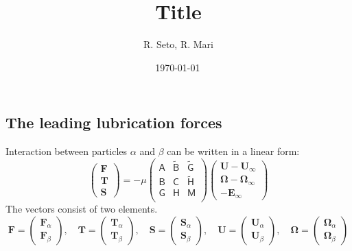 \documentclass[12pt]{article}
\title{Title}
\date{\shortdate\today \, \ampmtime }
\author{R. Seto, R. Mari}
\newcommand{\tens}[1]{\bm{\mathsf{#1}}}
\begin{document}
\maketitle


\subsection*{The leading lubrication forces}


Interaction between particles $\alpha$ and $\beta$
can be written in a linear form:
\begin{equation}
 \begin{pmatrix}
  \bm{F} \\ \bm{T} \\ \bm{S}
 \end{pmatrix}
 =
- \mu
\begin{pmatrix}
 \tens{A} &  \tilde{\tens{B}} &  \tilde{\tens{G}} \\
 \tens{B} &  \tens{C} &  \tilde{\tens{H}} \\
 \tens{G} &  \tens{H} &  \tens{M} \\
\end{pmatrix}
 \begin{pmatrix}
  \bm{U}-\bm{U}_{\infty} \\ \bm{\Omega} - \bm{\Omega}_{\infty}
 \\ -\bm{E}_{\infty}
 \end{pmatrix}
\end{equation}
The vectors consist of two elements.
\begin{equation}
 \bm{F}
= 
\begin{pmatrix}
 \bm{F}_\alpha \\  \bm{F}_\beta
\end{pmatrix}
,\quad
 \bm{T}
= 
\begin{pmatrix}
 \bm{T}_\alpha \\  \bm{T}_\beta
\end{pmatrix}
,\quad
 \bm{S}
= 
\begin{pmatrix}
 \bm{S}_\alpha \\  \bm{S}_\beta
\end{pmatrix}
,\quad
 \bm{U}
= 
\begin{pmatrix}
 \bm{U}_\alpha \\  \bm{U}_\beta
\end{pmatrix}
,\quad
 \bm{\Omega}
= 
\begin{pmatrix}
 \bm{\Omega}_\alpha \\  \bm{\Omega}_\beta
\end{pmatrix}
\end{equation}
\end{document}
